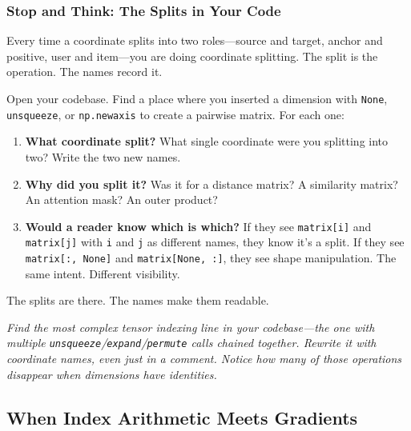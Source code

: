\documentclass[11pt,titlepage]{article}
\providecommand{\tightlist}{%
  \setlength{\itemsep}{0pt}\setlength{\parskip}{0pt}}
\begin{document}
\vspace{2em}

\hypertarget{stop-and-think-the-splits-in-your-code}{%
\subsubsection{Stop and Think: The Splits in Your
Code}\label{stop-and-think-the-splits-in-your-code}}

Every time a coordinate splits into two roles---source and target,
anchor and positive, user and item---you are doing coordinate splitting.
The split is the operation. The names record it.

Open your codebase. Find a place where you inserted a dimension with
\texttt{None}, \texttt{unsqueeze}, or \texttt{np.newaxis} to create a
pairwise matrix. For each one:

\begin{enumerate}
\def\labelenumi{\arabic{enumi}.}
\tightlist
\item
  \textbf{What coordinate split?} What single coordinate were you
  splitting into two? Write the two new names.
\item
  \textbf{Why did you split it?} Was it for a distance matrix? A
  similarity matrix? An attention mask? An outer product?
\item
  \textbf{Would a reader know which is which?} If they see
  \texttt{matrix{[}i{]}} and \texttt{matrix{[}j{]}} with \texttt{i} and
  \texttt{j} as different names, they know it's a split. If they see
  \texttt{matrix{[}:,\ None{]}} and \texttt{matrix{[}None,\ :{]}}, they
  see shape manipulation. The same intent. Different visibility.
\end{enumerate}

The splits are there. The names make them readable.

\vspace{2em}

\emph{Find the most complex tensor indexing line in your codebase---the
one with multiple \texttt{unsqueeze}/\texttt{expand}/\texttt{permute}
calls chained together. Rewrite it with coordinate names, even just in a
comment. Notice how many of those operations disappear when dimensions
have identities.}

\vspace{2em}

\hypertarget{when-index-arithmetic-meets-gradients}{%
\subsection{When Index Arithmetic Meets
Gradients}\label{when-index-arithmetic-meets-gradients}}
\end{document}
